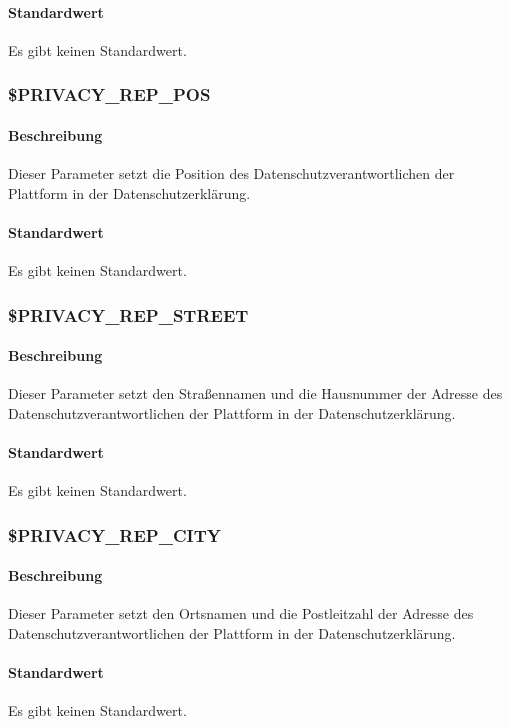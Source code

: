 \paragraph{Standardwert}Es gibt keinen Standardwert.

\subsubsection{\$PRIVACY\_REP\_POS}\label{config:privacy-rep-pos}
\paragraph{Beschreibung}Dieser Parameter setzt die Position des Datenschutzverantwortlichen der Plattform in der Datenschutzerklärung.
\paragraph{Standardwert}Es gibt keinen Standardwert.


\subsubsection{\$PRIVACY\_REP\_STREET}\label{config:privacy-rep-street}
\paragraph{Beschreibung}Dieser Parameter setzt den Straßennamen und die Hausnummer der Adresse des Datenschutzverantwortlichen der Plattform in der Datenschutzerklärung.
\paragraph{Standardwert}Es gibt keinen Standardwert.

\subsubsection{\$PRIVACY\_REP\_CITY}\label{config:privacy-rep-city}
\paragraph{Beschreibung}Dieser Parameter setzt den Ortsnamen und die Postleitzahl der Adresse des Datenschutzverantwortlichen der Plattform in der Datenschutzerklärung.
\paragraph{Standardwert}Es gibt keinen Standardwert.

